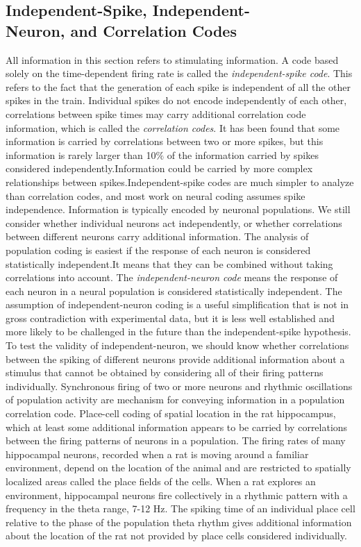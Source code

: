 \subsection{Independent-Spike, Independent-\\
  Neuron, and Correlation Codes}
\rem All information in this section refers to stimulating information.
 A code based solely on the time-dependent firing rate is called the \emph{independent-spike code}. This refers to the fact that the generation of each spike is independent of all the other spikes in the train.
 Individual spikes do not encode independently of each other, correlations between spike times may carry additional correlation code information, which is called the \emph{correlation codes}.
\rem It has been found that some information is carried by correlations between two or more spikes, but this information is rarely larger than 10$\%$ of the information carried by spikes considered independently.Information could be carried by more complex relationships between spikes.Independent-spike codes are much simpler to analyze than correlation codes, and most work on neural coding assumes spike independence.
\rul Information is typically encoded by neuronal populations.
\rem We still consider whether individual neurons act independently, or whether correlations between different neurons carry additional information.
\rem The analysis of population coding is easiest if the response of each neuron is considered statistically independent.It means that they can be combined without taking correlations into account.
 The \emph{independent-neuron code} means the response of each neuron in a neural population is considered statistically independent.
\rem The assumption of independent-neuron coding is a useful simplification that is not in gross contradiction with experimental data, but it is less well established and more likely to be challenged in the future than the independent-spike hypothesis.
\rem To test the validity of independent-neuron, we should know whether correlations between the spiking of different neurons provide additional information about a stimulus that cannot be obtained by considering all of their firing patterns individually.
\prin Synchronous firing of two or more neurons and rhythmic oscillations of population activity are mechanism for conveying information in a population correlation code.
\exm Place-cell coding of spatial location in the rat hippocampus, which at least some additional information appears to be carried by correlations between the firing patterns of neurons in a population. The firing rates of many hippocampal neurons, recorded when a rat is moving around a familiar environment, depend on the location of the animal and are restricted to spatially localized areas called the place fields of the cells. When a rat explores an environment, hippocampal neurons fire collectively in a rhythmic pattern with a frequency in the theta range, 7-12 Hz. The spiking time of an individual place cell relative to the phase of the population theta rhythm gives additional information about the location of the rat not provided by place cells considered individually.
